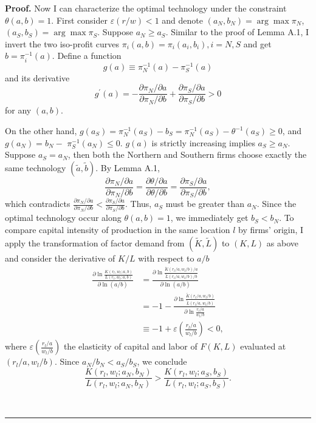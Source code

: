 \documentclass[notitlepage,11pt]{article}%
\newenvironment{proof}[1][Proof]{\noindent \textbf{#1.} }{\  \rule{0.5em}{0.5em}}
\begin{document}
\begin{proof}
Now I can characterize the optimal technology under the constraint
$\theta\left(  a,b\right)  =1$. First consider $\varepsilon\left(  r/w\right)
<1$ and denote $\left(  a_{N},b_{N}\right)  =\arg\max\pi_{N}$, $\left(
a_{S},b_{S}\right)  =\arg\max\pi_{S}$. Suppose $a_{N}\geq a_{S}$. Similar to
the proof of Lemma A.1, I invert the two iso-profit curves $\pi_{i}\left(
a,b\right)  =\pi_{i}\left(  a_{i},b_{i}\right)  ,i=N,S$ and get $b=\pi
_{i}^{-1}\left(  a\right)  $. Define a function%
\[
g\left(  a\right)  \equiv\pi_{N}^{-1}\left(  a\right)  -\pi_{S}^{-1}\left(
a\right)
\]
and its derivative%
\[
g^{\prime}\left(  a\right)  =-\frac{\partial\pi_{N}/\partial a}{\partial
\pi_{N}/\partial b}+\frac{\partial\pi_{S}/\partial a}{\partial\pi_{S}/\partial
b}>0
\]
for any $\left(  a,b\right)  $.

On the other hand, $g\left(  a_{S}\right)  =\pi_{N}^{-1}\left(  a_{S}\right)
-b_{S}=\pi_{N}^{-1}\left(  a_{S}\right)  -\theta^{-1}\left(  a_{S}\right)
\geq0$, and $g\left(  a_{N}\right)  =b_{N}-$ $\pi_{S}^{-1}\left(
a_{N}\right)  \leq0$. $g\left(  a\right)  $ is strictly increasing implies
$a_{S}\geq a_{N}$. Suppose $a_{S}=a_{N}$, then both the Northern and Southern
firms choose exactly the same technology $\left(  \tilde{a},\tilde{b}\right)
$. By Lemma A.1,%
\[
\frac{\partial\pi_{N}/\partial a}{\partial\pi_{N}/\partial b}=\frac
{\partial\theta/\partial a}{\partial\theta/\partial b}=\frac{\partial\pi
_{S}/\partial a}{\partial\pi_{S}/\partial b},
\]
which contradicts $\frac{\partial\pi_{N}/\partial a}{\partial\pi_{N}/\partial
b}<\frac{\partial\pi_{S}/\partial a}{\partial\pi_{S}/\partial b}$. Thus,
$a_{S}$ must be greater than $a_{N}$. Since the optimal technology occur along
$\theta\left(  a,b\right)  =1$, we immediately get $b_{S}<b_{N}$. To compare
capital intensity of production in the same location $l$ by firms' origin, I
apply the transformation of factor demand from $\left(  \tilde{K},\tilde
{L}\right)  $ to $\left(  K,L\right)  $ as above and consider the derivative
of $K/L$ with respect to $a/b$%
\begin{align*}
\frac{\partial\ln\frac{K\left(  r_{l},w_{l};a,b\right)  }{L\left(  r_{l}%
,w_{l};a,b\right)  }}{\partial\ln\left(  a/b\right)  }  &  =\frac{\partial
\ln\frac{\tilde{K}\left(  r_{l}/a,w_{l}/b\right)  /a}{\tilde{L}\left(
r_{l}/a,w_{l}/b\right)  /b}}{\partial\ln\left(  a/b\right)  }\\
&  =-1-\frac{\partial\ln\frac{\tilde{K}\left(  r_{l}/a,w_{l}/b\right)
}{\tilde{L}\left(  r_{l}/a,w_{l}/b\right)  }}{\partial\ln\frac{r_{l}/a}%
{w_{l}/b}}\\
&  \equiv-1+\varepsilon\left(  \frac{r_{l}/a}{w_{l}/b}\right)  <0,
\end{align*}
where $\varepsilon\left(  \frac{r_{l}/a}{w_{l}/b}\right)  $ the elasticity of
capital and labor of $F\left(  K,L\right)  $ evaluated at $\left(
r_{l}/a,w_{l}/b\right)  $. Since $a_{N}/b_{N}<a_{S}/b_{S}$, we conclude%
\[
\frac{K\left(  r_{l},w_{l};a_{N},b_{N}\right)  }{L\left(  r_{l},w_{l}%
;a_{N},b_{N}\right)  }>\frac{K\left(  r_{l},w_{l};a_{S},b_{S}\right)
}{L\left(  r_{l},w_{l};a_{S},b_{S}\right)  }.
\]



\end{proof}
\end{document}
